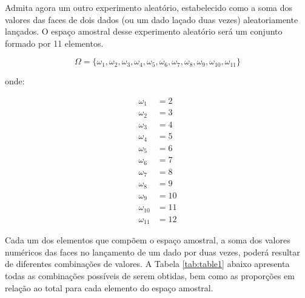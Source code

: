 \documentclass[
]{book}
\begin{document}
Admita agora um outro experimento aleatório, estabelecido como a soma dos valores das faces de dois dados (ou um dado laçado duas vezes) aleatoriamente lançados. O espaço amostral desse experimento aleatório será um conjunto formado por 11 elementos.

\[
\Omega = \{\omega_{1}, \omega_{2}, \omega_{3}, \omega_{4}, \omega_{5}, \omega_{6}, \omega_{7}, \omega_{8}, \omega_{9}, \omega_{10}, \omega_{11}\}
\]

onde:

\begin{align*}
\omega_{1} & =  2\\
\omega_{2} & =  3\\
\omega_{3} & = 4\\
\omega_{4} & = 5\\
\omega_{5} & = 6\\
\omega_{6} & = 7 \\
\omega_{7} & = 8\\
\omega_{8} & = 9\\
\omega_{9} & = 10\\
\omega_{10} & = 11\\
\omega_{11} & = 12     
\end{align*}

Cada um dos elementos que compõem o espaço amostral, a soma dos valores numéricos das faces no lançamento de um dado por duas vezes, poderá resultar de diferentes combinações de valores. A Tabela \ref{tab:table1} abaixo apresenta todas as combinações possíveis de serem obtidas, bem como as proporções em relação ao total para cada elemento do espaço amostral.

\hfill\break
\end{document}
